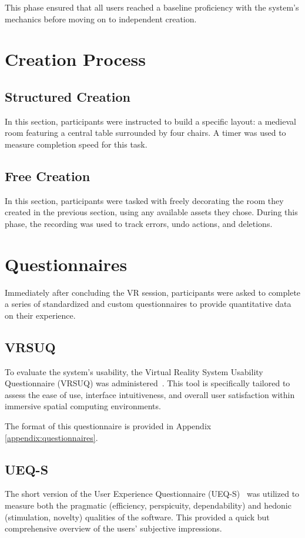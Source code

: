 \documentclass[inscr,ack,preface]{dithesis}
\begin{document}
This phase ensured that all users reached a baseline proficiency with the system's mechanics before moving on to independent creation.

\section{Creation Process}

\subsection{Structured Creation}
In this section, participants were instructed to build a specific layout: a medieval room featuring a central table surrounded by four chairs.
A timer was used to measure completion speed for this task.

\subsection{Free Creation}
In this section, participants were tasked with freely decorating the room they created in the previous section,
using any available assets they chose. During this phase, the recording was used to track errors, undo actions, and deletions.

\section{Questionnaires}
Immediately after concluding the VR session, participants were asked to complete a series of standardized and custom
questionnaires to provide quantitative data on their experience.

\subsection{VRSUQ}
To evaluate the system's usability, the Virtual Reality System Usability Questionnaire (VRSUQ) was administered~\cite{KimRhiu2024VRSUQ}.
This tool is specifically tailored to assess the ease of use, interface intuitiveness,
and overall user satisfaction within immersive spatial computing environments.

The format of this questionnaire is provided in Appendix \ref{appendix:questionnaires}.


\subsection{UEQ-S}
The short version of the User Experience Questionnaire (UEQ-S)~\cite{Schrepp2017UEQS} was utilized to measure
both the pragmatic (efficiency, perspicuity, dependability) and hedonic (stimulation, novelty) qualities
of the software. This provided a quick but comprehensive overview of the users' subjective impressions.
\end{document}
